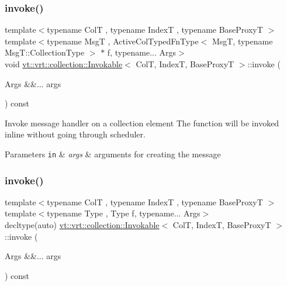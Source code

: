 \subsubsection{\texorpdfstring{invoke()}{invoke()}\hspace{0.1cm}{\footnotesize\ttfamily [2/3]}}
{\footnotesize\ttfamily template$<$typename ColT , typename IndexT , typename Base\+ProxyT $>$ \\
template$<$typename MsgT , Active\+Col\+Typed\+Fn\+Type$<$ Msg\+T, typename Msg\+T\+::\+Collection\+Type $>$ $\ast$ f, typename... Args$>$ \\
void \hyperlink{structvt_1_1vrt_1_1collection_1_1_invokable}{vt\+::vrt\+::collection\+::\+Invokable}$<$ ColT, IndexT, Base\+ProxyT $>$\+::invoke (\begin{DoxyParamCaption}\item[{Args \&\&...}]{args }\end{DoxyParamCaption}) const}



Invoke message handler on a collection element The function will be invoked inline without going through scheduler. 


\begin{DoxyParams}[1]{Parameters}
\mbox{\tt in}  & {\em args} & arguments for creating the message \\
\hline
\end{DoxyParams}
\mbox{\label{structvt_1_1vrt_1_1collection_1_1_invokable_a7e79eec4ab212b7e940c0ffaa8a2c171}} 
\subsubsection{\texorpdfstring{invoke()}{invoke()}\hspace{0.1cm}{\footnotesize\ttfamily [3/3]}}
{\footnotesize\ttfamily template$<$typename ColT , typename IndexT , typename Base\+ProxyT $>$ \\
template$<$typename Type , Type f, typename... Args$>$ \\
decltype(auto) \hyperlink{structvt_1_1vrt_1_1collection_1_1_invokable}{vt\+::vrt\+::collection\+::\+Invokable}$<$ ColT, IndexT, Base\+ProxyT $>$\+::invoke (\begin{DoxyParamCaption}\item[{Args \&\&...}]{args }\end{DoxyParamCaption}) const}



